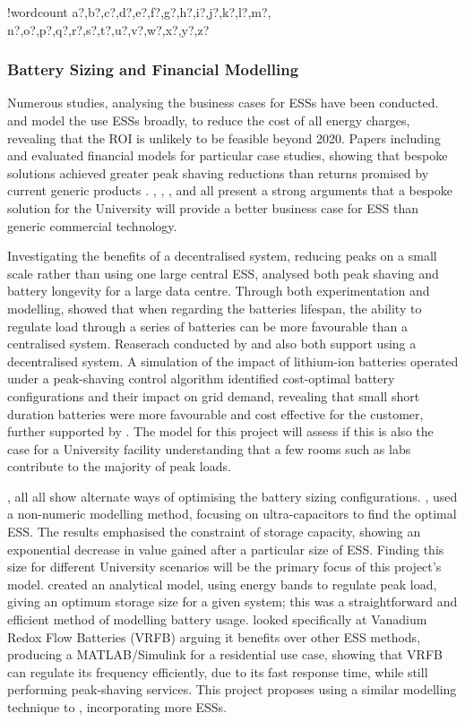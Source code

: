 \documentclass[fontsize=9.5pt]{extarticle}
\newcounter{words}
\newenvironment{counted}{%
  \setcounter{words}{0}
  \SearchList!{wordcount}{\stepcounter{words}}
    {a?,b?,c?,d?,e?,f?,g?,h?,i?,j?,k?,l?,m?,
    n?,o?,p?,q?,r?,s?,t?,u?,v?,w?,x?,y?,z?}
  \UndoBoundary{'}
  \SearchOrder{p;}}{%
  \StopSearching}
\begin{document}
\begin{counted}
\subsubsection{Battery Sizing and Financial
Modelling}\label{battery-sizing-and-financial-modelling}

Numerous studies, analysing the business cases for ESSs have been
conducted. \cite{7555795} and \cite{7555793} model the use ESSs broadly,
to reduce the cost of all energy charges, revealing that the ROI is
unlikely to be feasible beyond 2020. Papers including \cite{1300158} and
\cite{6175723} evaluated financial models for particular case studies,
showing that bespoke solutions achieved greater peak shaving reductions
than returns promised by current generic products \cite{abbpeakshave}.
\cite{7555795}, \cite{7555793}, \cite{1300158}, \cite{6175723} and
\cite{20164002874437} all present a strong arguments that a bespoke
solution for the University will provide a better business case for ESS
than generic commercial technology.

Investigating the benefits of a decentralised system, reducing peaks on
a small scale rather than using one large central ESS, \cite{6604477}
analysed both peak shaving and battery longevity for a large data
centre. Through both experimentation and modelling, \cite{6604477}
showed that when regarding the batteries lifespan, the ability to
regulate load through a series of batteries can be more favourable than
a centralised system. Reaserach conducted by \cite{6348200} and
\cite{Demonstr51:online} also both support using a decentralised system.
A simulation of the impact of lithium-ion batteries operated under a
peak-shaving control algorithm identified cost-optimal battery
configurations and their impact on grid demand, revealing that small
short duration batteries were more favourable and cost effective for the
customer, further supported by \cite{20164002874437}. The model for this
project will assess if this is also the case for a University facility
understanding that a few rooms such as labs contribute to the majority
of peak loads.

\cite{20160601898032}, \cite{Levron201280} all \cite{5371839} all show
alternate ways of optimising the battery sizing configurations.
\cite{5371839}, used a non-numeric modelling method, focusing on
ultra-capacitors to find the optimal ESS. The results emphasised the
constraint of storage capacity, showing an exponential decrease in value
gained after a particular size of ESS. Finding this size for different
University scenarios will be the primary focus of this project's model.
\cite{Levron201280} created an analytical model, using energy bands to
regulate peak load, giving an optimum storage size for a given system;
this was a straightforward and efficient method of modelling battery
usage. \cite{20160601898032} looked specifically at Vanadium Redox Flow
Batteries (VRFB) arguing it benefits over other ESS methods, producing a
MATLAB/Simulink for a residential use case, showing that VRFB can
regulate its frequency efficiently, due to its fast response time, while
still performing peak-shaving services. This project proposes using a
similar modelling technique to \cite{20160601898032}, incorporating more
ESSs.


\end{counted}
\end{document}
